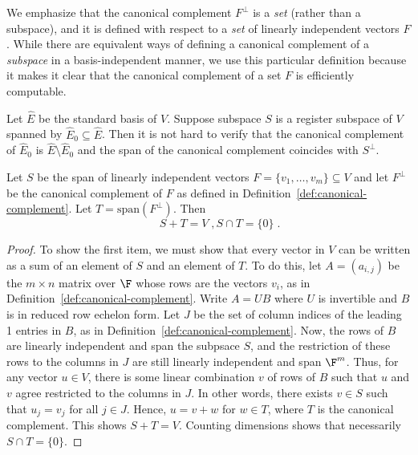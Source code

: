 \begin{remark}
We emphasize that the canonical complement $F^\perp$ is a \emph{set} (rather than
a subspace), and it is defined with respect to a \emph{set} of linearly
independent vectors $F$. While there are equivalent ways of defining
a canonical complement of a \emph{subspace} in a basis-independent manner, 
we use this particular definition because it makes it clear that
the canonical complement of a set $F$ is efficiently computable. 
\end{remark}

\begin{remark}
  Let $\hat{E}$ be the standard basis of $V$.
  Suppose subspace $S$ is a register subspace of $V$ spanned by
  $\hat{E}_0 \subseteq \hat{E}$.
  Then it is not hard to verify that the canonical complement of $\hat{E}_{0}$ is
  $\hat{E}\setminus \hat{E}_0$ and the span of the canonical complement coincides with
  $S^\perp$.
\end{remark}


\begin{lemma}
  \label{lem:canonical-complement}
  Let $S$ be the span of linearly independent vectors $F = \{v_1,\ldots,v_m \}
  \subseteq V$ and let $F^\perp$ be the canonical complement of $F$ as defined
  in Definition~\ref{def:canonical-complement}.
  Let $T = \mathrm{span}(F^\perp)$.
  Then
  \begin{equation*}
   \qquad S + T = V\;,  S \cap T = \{ 0 \} \;.
  \end{equation*}
\end{lemma}

\begin{proof}
To show the first item, we must show that every vector in $V$ can be
written as a sum of an element of $S$ and an element of $T$. To do
this, let $A = (a_{i, j})$ be the $m\times n$ matrix over $\F$ whose
rows are the vectors $v_i$, as in Definition~\ref{def:canonical-complement}.
  Write $A = U B$ where $U$ is invertible and $B$ is in reduced row echelon
  form.
  Let $J$ be the set of column indices of the leading 1 entries in
  $B$, as in Definition~\ref{def:canonical-complement}.  
  Now, the rows of $B$ are linearly independent and span the subpsace $S$, and the restriction of
  these rows to the columns in $J$ are still linearly independent and
  span $\F^m$. Thus, for any vector $u \in V$, there is some linear
  combination $v$ of rows of $B$ such that $u$ and $v$ agree
  restricted to the columns in $J$. In other words, there exists $v
  \in S$ such that $u_j = v_j$ for all $j \in J$. Hence, $u = v + w$
  for $w \in T$, where $T$ is the canonical complement.
  This shows $S + T = V$.
  Counting dimensions shows that necessarily $S\cap T =
  \{0\}$.
\end{proof}

